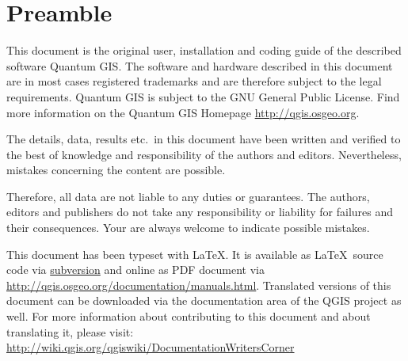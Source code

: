 
\newcommand\qgistip[1]{\raggedright\small{#1}}
\renewcommand{\topfraction}{0.85}
\renewcommand{\textfraction}{0.1}
\renewcommand{\floatpagefraction}{0.75}

\thispagestyle{empty}


\section*{Preamble}


\vspace{1cm}



This document is the original user, installation and coding guide of the described 
software Quantum GIS. The software and hardware described in this 
document are in most cases registered trademarks and are therefore subject 
to the legal requirements. Quantum GIS is subject to the GNU General Public 
License. Find more information on the Quantum GIS Homepage
\url{http://qgis.osgeo.org}.

The details, data, results etc.~in this document have been 
written and verified to the best of knowledge and responsibility of the 
authors and editors. Nevertheless, mistakes concerning the content are possible.

Therefore, all data are not liable to any duties or guarantees. The authors, editors 
and publishers do not take any responsibility or liability for failures and 
their consequences. Your are always welcome to indicate possible mistakes.

This document has been typeset with \LaTeX. It is available as \LaTeX~source
code via \href{http://wiki.qgis.org/qgiswiki/DocumentationWritersCorner}{subversion} 
and online as PDF document via \url{http://qgis.osgeo.org/documentation/manuals.html}. 
Translated versions of this document can be downloaded via the documentation 
area of the QGIS project as well. For more information about contributing to
this document and about translating it, please visit: \url{http://wiki.qgis.org/qgiswiki/DocumentationWritersCorner} 

